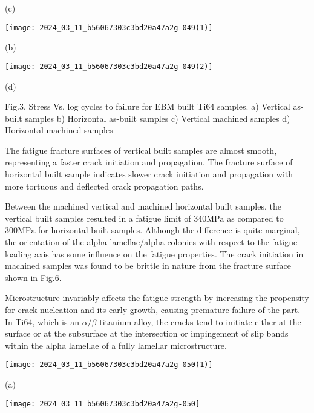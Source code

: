 \documentclass[10pt]{article}
\begin{document}
(c)

\begin{center}
\texttt{[image: 2024\_03\_11\_b56067303c3bd20a47a2g-049(1)]}
\end{center}

(b)

\begin{center}
\texttt{[image: 2024\_03\_11\_b56067303c3bd20a47a2g-049(2)]}
\end{center}

(d)

Fig.3. Stress Vs. log cycles to failure for EBM built Ti64 samples. a) Vertical as-built samples b) Horizontal as-built samples c) Vertical machined samples d) Horizontal machined samples

The fatigue fracture surfaces of vertical built samples are almost smooth, representing a faster crack initiation and propagation. The fracture surface of horizontal built sample indicates slower crack initiation and propagation with more tortuous and deflected crack propagation paths.

Between the machined vertical and machined horizontal built samples, the vertical built samples resulted in a fatigue limit of $340 \mathrm{MPa}$ as compared to $300 \mathrm{MPa}$ for horizontal built samples. Although the difference is quite marginal, the orientation of the alpha lamellae/alpha colonies with respect to the fatigue loading axis has some influence on the fatigue properties. The crack initiation in machined samples was found to be brittle in nature from the fracture surface shown in Fig.6.

Microstructure invariably affects the fatigue strength by increasing the propensity for crack nucleation and its early growth, causing premature failure of the part. In Ti64, which is an $\alpha / \beta$ titanium alloy, the cracks tend to initiate either at the surface or at the subsurface at the intersection or impingement of slip bands within the alpha lamellae of a fully lamellar microstructure.

\begin{center}
\texttt{[image: 2024\_03\_11\_b56067303c3bd20a47a2g-050(1)]}
\end{center}

(a)

\begin{center}
\texttt{[image: 2024\_03\_11\_b56067303c3bd20a47a2g-050]}
\end{center}
\end{document}
